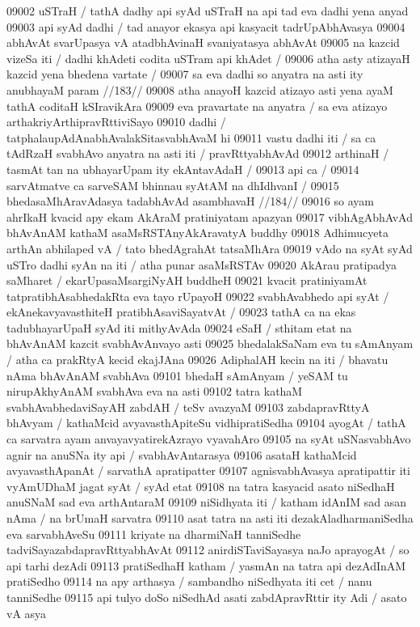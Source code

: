 09002 uSTraH / tathA dadhy api syAd uSTraH na api tad eva dadhi yena anyad 
09003 api syAd dadhi / tad anayor ekasya api kasyacit tadrUpAbhAvasya  
09004 abhAvAt svarUpasya vA atadbhAvinaH svaniyatasya abhAvAt 
09005 na kazcid vizeSa iti / dadhi khAdeti codita uSTram api khAdet /
09006 	atha asty atizayaH kazcid yena bhedena vartate /
09007 	sa eva dadhi so anyatra na asti ity anubhayaM param //183// 
09008 atha anayoH kazcid atizayo asti yena ayaM tathA coditaH  kSIravikAra  
09009 eva pravartate na anyatra / sa eva atizayo arthakriyArthipravRttiviSayo
09010 dadhi / tatphalaupAdAnabhAvalakSitasvabhAvaM hi
09011 vastu dadhi iti / sa ca tAdRzaH svabhAvo anyatra na asti iti / pravRttyabhAvAd
09012 arthinaH / tasmAt tan na ubhayarUpam ity ekAntavAdaH /  
09013 api ca /
09014 	sarvAtmatve ca sarveSAM bhinnau syAtAM na dhIdhvanI /
09015 	bhedasaMhAravAdasya tadabhAvAd asambhavaH //184// 
09016 so ayam ahrIkaH kvacid apy ekam AkAraM pratiniyatam apazyan
09017 vibhAgAbhAvAd bhAvAnAM kathaM asaMsRSTAnyAkAravatyA buddhy
09018 Adhimucyeta arthAn abhilaped vA / tato bhedAgrahAt tatsaMhAra 
09019 vAdo na syAt syAd uSTro dadhi syAn na iti / atha punar asaMsRSTAv 
09020 AkArau pratipadya saMharet / ekarUpasaMsargiNyAH buddheH
09021 kvacit pratiniyamAt tatpratibhAsabhedakRta eva tayo rUpayoH
09022 svabhAvabhedo api syAt / ekAnekavyavasthiteH pratibhAsaviSayatvAt /
09023 tathA ca na ekas tadubhayarUpaH syAd iti mithyAvAda
09024 eSaH / sthitam etat na bhAvAnAM kazcit svabhAvAnvayo asti  
09025 bhedalakSaNam eva tu sAmAnyam / atha ca prakRtyA kecid  ekajJAna
09026 AdiphalAH kecin na iti / bhavatu nAma bhAvAnAM svabhAva 
09101 bhedaH sAmAnyam / yeSAM tu nirupAkhyAnAM svabhAva eva na asti
09102 tatra kathaM svabhAvabhedaviSayAH zabdAH / teSv avazyaM  
09103 zabdapravRttyA bhAvyam / kathaMcid avyavasthApiteSu  vidhipratiSedha
09104 ayogAt / tathA ca sarvatra ayam anvayavyatirekAzrayo vyavahAro  
09105 na syAt uSNasvabhAvo agnir na anuSNa ity api / svabhAvAntarasya  
09106 asataH kathaMcid avyavasthApanAt / sarvathA apratipatter
09107 agnisvabhAvasya apratipattir iti vyAmUDhaM jagat syAt / syAd etat
09108 na tatra kasyacid asato niSedhaH anuSNaM sad eva arthAntaraM
09109 niSidhyata iti / katham idAnIM sad asan nAma / na brUmaH sarvatra  
09110 asat tatra na asti iti dezakAladharmaniSedha eva sarvabhAveSu 
09111 kriyate na dharmiNaH tanniSedhe tadviSayazabdapravRttyabhAvAt
09112 anirdiSTaviSayasya naJo aprayogAt / so api tarhi dezAdi 
09113 pratiSedhaH katham / yasmAn na tatra api dezAdInAM pratiSedho 
09114 na apy arthasya / sambandho niSedhyata iti cet / nanu tanniSedhe
09115 api tulyo doSo niSedhAd asati zabdApravRttir ity Adi / asato vA asya 
